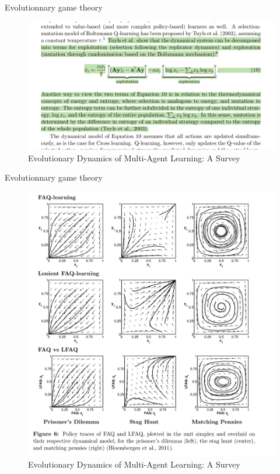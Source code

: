 \documentclass[aspectratio=169,xcolor=dvipsnames]{beamer}
\begin{document}
\begin{frame}{Evolutionnary game theory}
  \begin{figure}
    \centering
    \includegraphics[scale=0.30]{Équation dynamique système.png}
    \caption{\citet{bloembergen_evolutionary_2015} Evolutionary
Dynamics of Multi-Agent Learning: A Survey}
  \end{figure}
\end{frame}

\begin{frame}{Evolutionnary game theory}
  \begin{figure}
    \centering
    \includegraphics[scale=0.15]{Simplex.png}
    \caption{\citet{bloembergen_evolutionary_2015} Evolutionary
Dynamics of Multi-Agent Learning: A Survey}
  \end{figure}
\end{frame}
\end{document}
